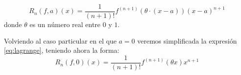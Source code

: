 \documentclass[a4paper, 12pt]{article}
\begin{document}
\begin{equation}
\label{eq:lagrange}
R_{n}\left(f,a\right)\!\left(x\right)=
\frac1{(n+1)!} f^{\left(n+1\right)}\!(\theta\!\cdot\!(x-a))(x-a)^{n+1}
\end{equation}
donde $\theta$ es un número real entre $0$ y $1$.

Volviendo al caso particular en el que $a=0$ veremos simplificada
la expresión \ref{eq:lagrange}, teniendo ahora la forma:
$$R_{n}\left(f,0\right)\!\left(x\right)=
\frac1{(n+1)!} f^{\left(n+1\right)}\!(\theta x)x^{n+1}$$
\end{document}

